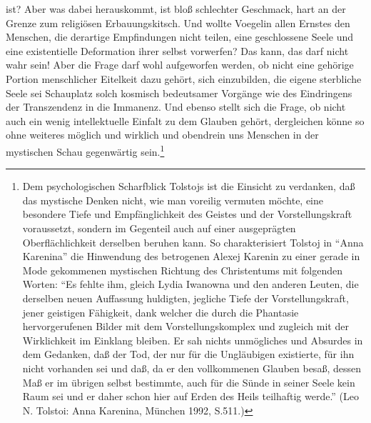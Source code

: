 ist? Aber was dabei herauskommt, ist bloß schlechter Geschmack, hart an
 der Grenze zum religiösen Erbauungskitsch. Und wollte Voegelin allen
 Ernstes den Menschen, die derartige Empfindungen nicht teilen, eine
 geschlossene Seele und eine existentielle Deformation ihrer selbst
 vorwerfen?  Das kann, das darf nicht wahr sein! Aber die Frage darf
 wohl aufgeworfen werden, ob nicht eine gehörige Portion menschlicher
 Eitelkeit dazu gehört, sich einzubilden, die eigene sterbliche Seele
 sei Schauplatz solch kosmisch bedeutsamer Vorgänge wie des Eindringens
 der Transzendenz in die Immanenz.  Und ebenso stellt sich die Frage, ob
 nicht auch ein wenig intellektuelle Einfalt zu dem Glauben gehört,
 dergleichen könne so ohne weiteres möglich und wirklich und obendrein
 uns Menschen in der mystischen Schau gegenwärtig sein.\footnote{Dem
   psychologischen Scharfblick Tolstojs ist die Einsicht zu verdanken,
   daß das mystische Denken nicht, wie man voreilig vermuten möchte,
   eine besondere Tiefe und Empfänglichkeit des Geistes und der
   Vorstellungskraft voraussetzt, sondern im Gegenteil auch auf einer
   ausgeprägten Oberflächlichkeit derselben beruhen kann. So
   charakterisiert Tolstoj in "`Anna Karenina"' die Hinwendung des
   betrogenen Alexej Karenin zu einer gerade in Mode gekommenen
   mystischen Richtung des Christentums mit folgenden Worten: "`Es
   fehlte ihm, gleich Lydia Iwanowna und den anderen Leuten, die
   derselben neuen Auffassung huldigten, jegliche Tiefe der
   Vorstellungskraft, jener geistigen Fähigkeit, dank welcher die durch
   die Phantasie hervorgerufenen Bilder mit dem Vorstellungskomplex und
   zugleich mit der Wirklichkeit im Einklang bleiben. Er sah nichts
   unmögliches und Absurdes in dem Gedanken, daß der Tod, der nur für
   die Ungläubigen existierte, für ihn nicht vorhanden sei und daß, da
   er den vollkommenen Glauben besaß, dessen Maß er im übrigen selbst
   bestimmte, auch für die Sünde in seiner Seele kein Raum sei und er
   daher schon hier auf Erden des Heils teilhaftig werde."'  (Leo N.
   Tolstoi: Anna Karenina, München 1992, S.511.)}


